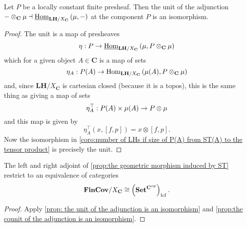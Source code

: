 \begin{proposition*}
\label{prop: the unit of the adjunction is an isomorphism}
Let $P$ be a locally constant finite presheaf. Then the unit of the adjunction $-\otimes_{\mathbf{C}} \operatorname{\mu} \dashv \underline{\operatorname{Hom}}_{\mathbf{LH}/X_{\mathbf{C}}}\left(\operatorname{\mu},-\right)$ at the component $P$ is an isomorphism.
\end{proposition*}
\begin{proof}
The unit is a map of presheaves
\begin{equation}
\label{eq:the unit of the adjunction equation}
\eta : P \to \underline{\operatorname{Hom}}_{\mathbf{LH}/X_{\mathbf{C}}}\left(\operatorname{\mu}, P\otimes_{\mathbf{C}} \operatorname{\mu}\right)
\end{equation}
which for a given object $A \in \mathbf{C}$ is a map of sets
\[ \eta_A : P(A) \to \operatorname{Hom}_{\mathbf{LH}/X_{\mathbf{C}}}\left(\operatorname{\mu}(A), P \otimes_{\mathbf{C}} \operatorname{\mu}\right) \]
and, since $\mathbf{LH}/X_{\mathbf{C}}$ is cartesian closed (because it is a topos), this is the same thing as giving a map of sets
\[ \eta_A^\top : P(A) \times \operatorname{\mu}(A) \to P \otimes \operatorname{\mu} \]
and this map is given by
\[ \eta_A^\top(x, [f,p]) = x \otimes [f,p]. \]
Now the isomorphism in \cref{coro:number of LHs if size of P(A) from ST(A) to the tensor product} is precisely the unit.
\end{proof}

\begin{corollary*}
\label{coro:left and right adjoint restrict to an equivalence of categories for lcf}
The left and right adjoint of \cref{prop:the geometric morphism induced by ST} restrict to an equivalence of categories
\[ \mathbf{FinCov}/X_{\mathbf{C}} \cong \left(\mathbf{Set}^{\mathbf{C}^{op}}\right)_{\operatorname{lcf}}. \]
\end{corollary*}
\begin{proof}
Apply \cref{prop: the unit of the adjunction is an isomorphism} and \cref{prop:the counit of the adjunction is an isomorphism}.
\end{proof}

